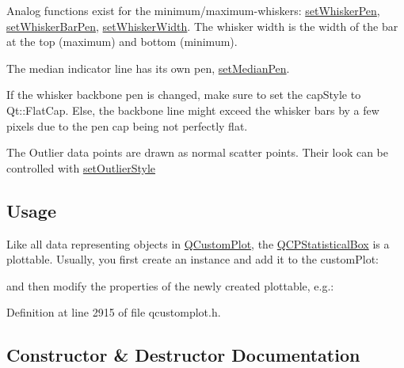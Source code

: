 Analog functions exist for the minimum/maximum-\/whiskers\+: \hyperlink{class_q_c_p_statistical_box_a4a5034cb3b9b040444df05ab1684620b}{set\+Whisker\+Pen}, \hyperlink{class_q_c_p_statistical_box_aa8d3e503897788e1abf68dc74b5f147f}{set\+Whisker\+Bar\+Pen}, \hyperlink{class_q_c_p_statistical_box_adf378812446bd66f34d1f7f293d991cd}{set\+Whisker\+Width}. The whisker width is the width of the bar at the top (maximum) and bottom (minimum).

The median indicator line has its own pen, \hyperlink{class_q_c_p_statistical_box_a7260ac55b669f5d0a74f16d5ca84c52c}{set\+Median\+Pen}.

If the whisker backbone pen is changed, make sure to set the cap\+Style to Qt\+::\+Flat\+Cap. Else, the backbone line might exceed the whisker bars by a few pixels due to the pen cap being not perfectly flat.

The Outlier data points are drawn as normal scatter points. Their look can be controlled with \hyperlink{class_q_c_p_statistical_box_ad5241943422eb8e58360a97e99ad6aa7}{set\+Outlier\+Style}\hypertarget{class_q_c_p_statistical_box_usage}{}\subsection{Usage}\label{class_q_c_p_statistical_box_usage}
Like all data representing objects in \hyperlink{class_q_custom_plot}{Q\+Custom\+Plot}, the \hyperlink{class_q_c_p_statistical_box}{Q\+C\+P\+Statistical\+Box} is a plottable. Usually, you first create an instance and add it to the custom\+Plot\+: 
\begin{DoxyCodeInclude}
\end{DoxyCodeInclude}
and then modify the properties of the newly created plottable, e.\+g.\+: 
\begin{DoxyCodeInclude}
\end{DoxyCodeInclude}


Definition at line 2915 of file qcustomplot.\+h.



\subsection{Constructor \& Destructor Documentation}
\hypertarget{class_q_c_p_statistical_box_a75c2b3e7fcd0741cc981693a2ba63b27}{}
